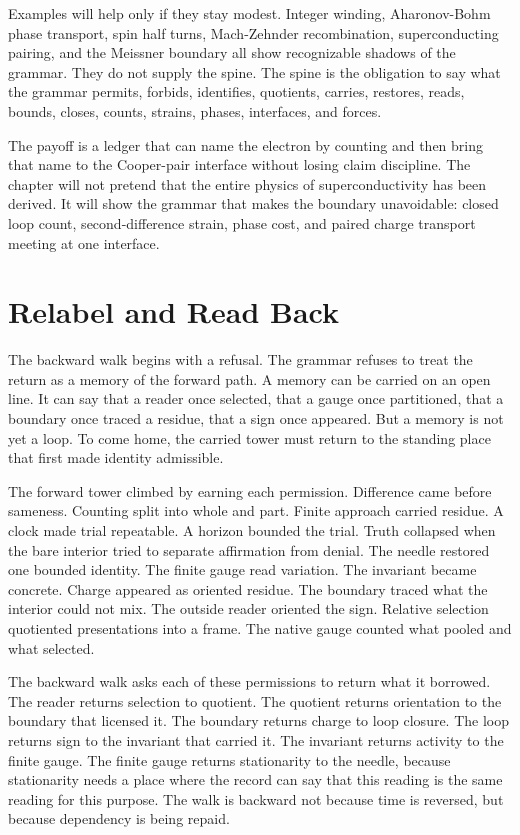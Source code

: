 Examples will help only if they stay modest. Integer winding, Aharonov-Bohm
phase transport, spin half turns, Mach-Zehnder recombination,
superconducting pairing, and the Meissner boundary all show recognizable
shadows of the grammar. They do not supply the spine. The spine is the
obligation to say what the grammar permits, forbids, identifies, quotients,
carries, restores, reads, bounds, closes, counts, strains, phases,
interfaces, and forces.

The payoff is a ledger that can name the electron by counting and then bring
that name to the Cooper-pair interface without losing claim discipline. The
chapter will not pretend that the entire physics of superconductivity has
been derived. It will show the grammar that makes the boundary unavoidable:
closed loop count, second-difference strain, phase cost, and paired charge
transport meeting at one interface.

\section{Relabel and Read Back}

The backward walk begins with a refusal. The grammar refuses to treat the
return as a memory of the forward path. A memory can be carried on an open
line. It can say that a reader once selected, that a gauge once partitioned,
that a boundary once traced a residue, that a sign once appeared. But a
memory is not yet a loop. To come home, the carried tower must return to the
standing place that first made identity admissible.

The forward tower climbed by earning each permission. Difference came before
sameness. Counting split into whole and part. Finite approach carried
residue. A clock made trial repeatable. A horizon bounded the trial. Truth
collapsed when the bare interior tried to separate affirmation from denial.
The needle restored one bounded identity. The finite gauge read variation.
The invariant became concrete. Charge appeared as oriented residue. The
boundary traced what the interior could not mix. The outside reader oriented
the sign. Relative selection quotiented presentations into a frame. The
native gauge counted what pooled and what selected.

The backward walk asks each of these permissions to return what it borrowed.
The reader returns selection to quotient. The quotient returns orientation to
the boundary that licensed it. The boundary returns charge to loop closure.
The loop returns sign to the invariant that carried it. The invariant returns
activity to the finite gauge. The finite gauge returns stationarity to the
needle, because stationarity needs a place where the record can say that this
reading is the same reading for this purpose. The walk is backward not
because time is reversed, but because dependency is being repaid.

